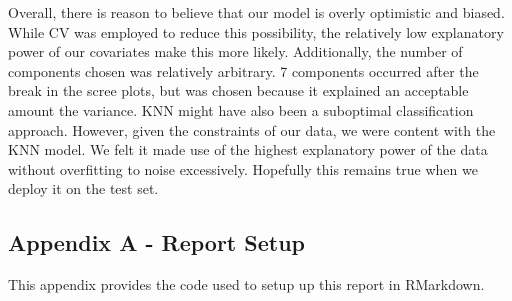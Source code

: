 \documentclass[
]{article}
\begin{document}
Overall, there is reason to believe that our model is overly optimistic
and biased. While CV was employed to reduce this possibility, the
relatively low explanatory power of our covariates make this more
likely. Additionally, the number of components chosen was relatively
arbitrary. 7 components occurred after the break in the scree plots, but
was chosen because it explained an acceptable amount the variance. KNN
might have also been a suboptimal classification approach. However,
given the constraints of our data, we were content with the KNN model.
We felt it made use of the highest explanatory power of the data without
overfitting to noise excessively. Hopefully this remains true when we
deploy it on the test set.

\begin{table}

\caption{\label{tab:unnamed-chunk-13}Above Median Customer Affected Confusion Matrix Metrics}
\centering
{}
\end{table}

\newpage

\hypertarget{appendixA}{%
\subsection{Appendix A - Report Setup}\label{appendixA}}

This appendix provides the code used to setup up this report in
RMarkdown.
\end{document}
